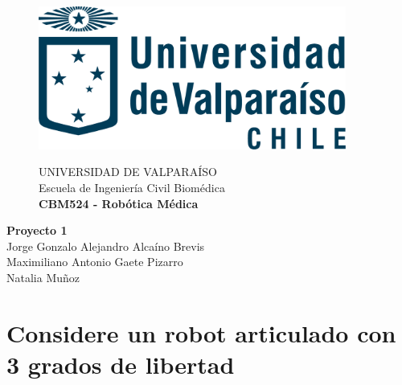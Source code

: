 \documentclass[10pt]{article}
\theoremstyle{definition}
\theoremstyle{remark}
\theoremstyle{definition}
\numberwithin{equation}{prob}
\begin{document}
\begin{sloppypar}

\end{sloppypar}

\begin{titlepage}
	\begin{figure}
		\begin{minipage}{4cm}
			\includegraphics[width=0.9\textwidth]{./figures/logo}
		\end{minipage}
		\begin{minipage}{11cm}
			\vspace{4mm}
			{\sc UNIVERSIDAD DE VALPARAÍSO}\\
			Escuela de Ingeniería Civil Biomédica\\
			{\bf CBM524 - Robótica Médica}\\
			\vspace{0mm}
			\hrulefill
		\end{minipage}
	\end{figure}
	\phantom{""}\vspace{60mm}


	\begin{center}
		\Huge{\textbf{Proyecto 1}}\vspace{95mm}\\
		\raggedleft \Large{Jorge Gonzalo Alejandro Alcaíno Brevis}\\
		\raggedleft \Large{Maximiliano Antonio Gaete Pizarro}\\
		\raggedleft \Large{Natalia Muñoz}\\
	\end{center}


\end{titlepage}

\section{Considere un robot articulado con 3 grados de libertad}
\end{document}
